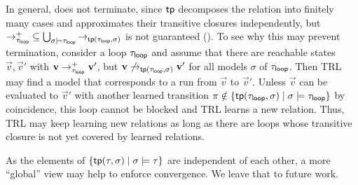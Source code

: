 \begin{remark}[Termination]
  \label{remark:termination}
In general,  does not terminate, since
 $\mathsf{tp}$ decomposes the relation into finitely many cases and
approximates their transitive closures independently, but
${\to^+_{\tau_{\mathsf{loop}}}} \subseteq \bigcup_{\sigma \models \tau_{\mathsf{loop}}}
{\to_{\mathsf{tp}(\tau_{\mathsf{loop}},\sigma)}}$ is not guaranteed ().
%
To see why this may prevent termination, consider a loop $\tau_{\mathsf{loop}}$ and assume that there are reachable states
$\vec{v},\vec{v}'$ with $\bm{\mathrm{v}} \to_{\tau_{\mathsf{loop}}}^+ \bm{\mathrm{v}}'$, but $\bm{\mathrm{v}}
\not\to_{\mathsf{tp}(\tau_{\mathsf{loop}},\sigma)} \bm{\mathrm{v}}'$ for all models $\sigma$ of
$\tau_{\mathsf{loop}}$.
%
Then TRL may find a model that corresponds to a run from $\vec{v}$ to $\vec{v}'$.
%
Unless $\vec{v}$ can be evaluated to $\vec{v}'$ with another learned transition $\pi \notin \{\mathsf{tp}(\tau_{\mathsf{loop}},\sigma) \mid \sigma \models \tau_{\mathsf{loop}}\}$ by coincidence, this loop cannot be blocked and TRL learns a new relation.
%
Thus, TRL may keep learning new relations as long as there are loops whose transitive closure is not yet covered by learned relations.

As the elements of $\{\mathsf{tp}(\tau,\sigma) \mid \sigma \models \tau\}$ are independent of each other, a more ``global'' view may help to enforce convergence.
%
We leave that to future work.
\end{remark}



